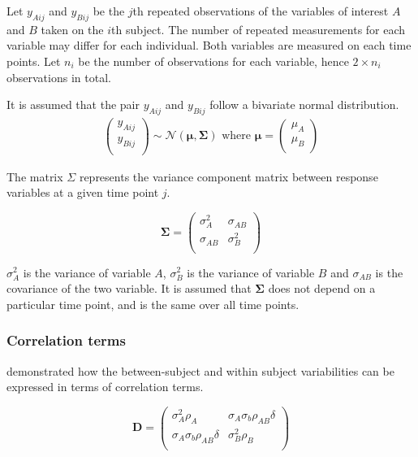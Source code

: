 \documentclass[12pt, a4paper]{report}
\theoremstyle{plain}
\theoremstyle{definition}
\theoremstyle{remark}
\begin{document}
	Let $y_{Aij}$ and $y_{Bij}$ be the $j$th repeated observations of the variables of interest $A$ and $B$ taken on the $i$th subject. The number of repeated measurements for each variable may differ for each individual.
	Both variables are measured on each time points. Let $n_{i}$ be the number of observations for each variable, hence $2\times n_{i}$ observations in total.
	
	It is assumed that the pair $y_{Aij}$ and $y_{Bij}$ follow a bivariate normal distribution.
	\begin{eqnarray*}
		\left(
		\begin{array}{c}
			y_{Aij} \\
			y_{Bij} \\
		\end{array}
		\right) \sim \mathcal{N}(
		\boldsymbol{\mu}, \boldsymbol{\Sigma})\mbox{   where } \boldsymbol{\mu} = \left(
		\begin{array}{c}
			\mu_{A} \\
			\mu_{B} \\
		\end{array}
		\right)
	\end{eqnarray*}
	
	The matrix $\Sigma$ represents the variance component matrix between response variables at a given time point $j$.
	
	\[
	\boldsymbol{\Sigma} = \left( \begin{array}{cc}
	\sigma^2_{A} & \sigma_{AB} \\
	\sigma_{AB} & \sigma^2_{B}\\
	\end{array}   \right)
	\]
	
	$\sigma^2_{A}$ is the variance of variable $A$, $\sigma^2_{B}$ is the variance of variable $B$ and $\sigma_{AB}$ is the covariance of the two variable. It is assumed that $\boldsymbol{\Sigma}$ does not depend on a particular time point, and is the same over all time points.
	
	
	\subsubsection{Correlation terms}
	\citet{hamlett} demonstrated how the between-subject and within subject variabilities can be expressed in terms of
	correlation terms.
	
	\[
	\boldsymbol{D} = \left( \begin{array}{cc}
	\sigma^2_{A}\rho_{A} & \sigma_{A}\sigma_{b}\rho_{AB}\delta \\
	\sigma_{A}\sigma_{b}\rho_{AB}\delta & \sigma^2_{B}\rho_{B}\\
	
	\end{array}\right)
	\]
	
\end{document}
